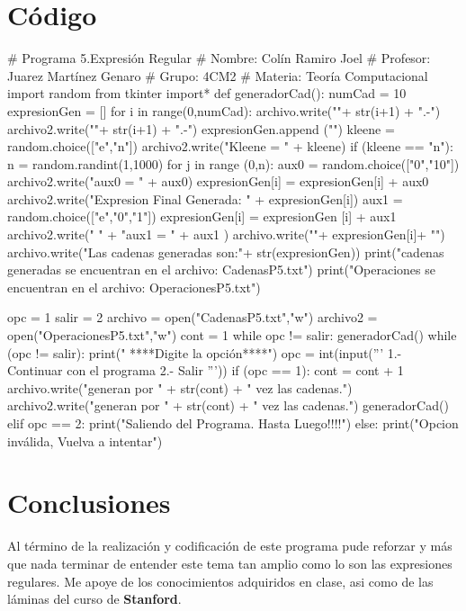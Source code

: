 \documentclass{article}
\begin{document}
	\section*{Código}
	\begin{python}
	# Programa 5.Expresión Regular
	# Nombre: Colín Ramiro Joel
	# Profesor: Juarez Martínez Genaro
	# Grupo: 4CM2
	# Materia: Teoría Computacional
	import random
	from tkinter import*
	def generadorCad():
		numCad = 10
		expresionGen = []    
		for i in range(0,numCad):
			archivo.write("\nCadena "+ str(i+1) + ".-")
			archivo2.write("\n\nCadena "+ str(i+1) + ".-")
			expresionGen.append ("")
			kleene = random.choice(["e","n"])
			archivo2.write("\n   Kleene = " + kleene)
			if (kleene == "n"):
				n = random.randint(1,1000)
				for j in range (0,n):
					aux0 = random.choice(["0","10"])        
					archivo2.write("\n   aux0 = " + aux0)
					expresionGen[i] = expresionGen[i] + aux0
			archivo2.write("\n   Expresion Final Generada: " + expresionGen[i])
			aux1 = random.choice(["e","0","1"])
			expresionGen[i] = expresionGen [i] + aux1
			archivo2.write(" " + "\n   aux1 =  " + aux1 )
			archivo.write("\n"+ expresionGen[i]+ "\n ")
		archivo.write("Las cadenas generadas son:\n"+ str(expresionGen))
		print("\nLas cadenas generadas se encuentran en el archivo: CadenasP5.txt\n")
		print("\nLas Operaciones se encuentran en el archivo: OperacionesP5.txt\n")
	
	opc = 1
	salir = 2
	archivo = open("CadenasP5.txt","w")
	archivo2 = open("OperacionesP5.txt","w")
	cont = 1
	while opc != salir:
		generadorCad()  			
		while (opc != salir): 
			print("   ****Digite la opción****")
			opc = int(input('''
			1.- Continuar con el programa
			2.- Salir
			'''))
			if (opc == 1):
				cont = cont + 1
				archivo.write("\n\nSe generan por " + str(cont) + " vez las cadenas.\n")
				archivo2.write("\n\nSe generan por " + str(cont) + " vez las cadenas.\n")
				generadorCad()  
			elif opc == 2:
				print("Saliendo del Programa. Hasta Luego!!!!")         
			else:
				print("Opcion inválida, Vuelva a intentar")
	\end{python}
	
	\section*{Conclusiones}
	Al término de la realización y codificación de este programa pude reforzar y más que nada terminar de entender este tema tan amplio como lo son las expresiones regulares. Me apoye de los conocimientos adquiridos en clase, asi como
 	de las láminas del curso de \textbf{Stanford}.
 	 	
\end{document}
